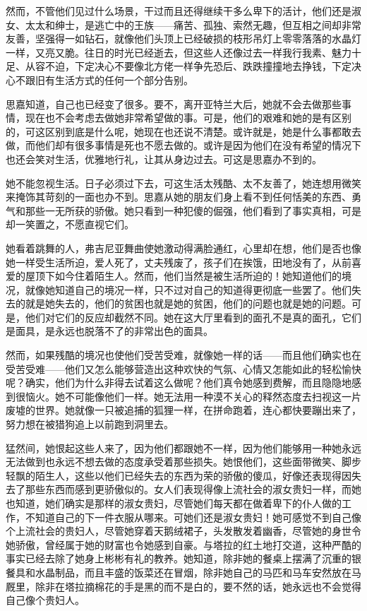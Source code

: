 \par 然而，不管他们见过什么场景，干过而且还得继续干多么卑下的活计，他们还是淑女、太太和绅士，是逃亡中的王族——痛苦、孤独、索然无趣，但互相之间却非常友善，坚强得一如钻石，就像他们头顶上已经破损的枝形吊灯上零零落落的水晶灯一样，又亮又脆。往日的时光已经逝去，但这些人还像过去一样我行我素、魅力十足、从容不迫，下定决心不要像北方佬一样争先恐后、跌跌撞撞地去挣钱，下定决心不跟旧有生活方式的任何一个部分告别。
\par 思嘉知道，自己也已经变了很多。要不，离开亚特兰大后，她就不会去做那些事情，现在也不会考虑去做她非常希望做的事。可是，他们的艰难和她的是有区别的，可这区别到底是什么呢，她现在也还说不清楚。或许就是，她是什么事都敢去做，而他们却有很多事情是死也不愿去做的。或许是因为他们在没有希望的情况下也还会笑对生活，优雅地行礼，让其从身边过去。可这是思嘉办不到的。
\par 她不能忽视生活。日子必须过下去，可这生活太残酷、太不友善了，她连想用微笑来掩饰其苛刻的一面也办不到。思嘉从她的朋友们身上看不到任何恬美的东西、勇气和那些一无所获的骄傲。她只看到一种犯傻的倔强，他们看到了事实真相，可是却一笑置之，不愿直视它们。
\par 她看着跳舞的人，弗吉尼亚舞曲使她激动得满脸通红，心里却在想，他们是否也像她一样受生活所迫，爱人死了，丈夫残废了，孩子们在挨饿，田地没有了，从前喜爱的屋顶下如今住着陌生人。然而，他们当然是被生活所迫的！她知道他们的境况，就像她知道自己的境况一样，只不过对自己的知道得更彻底一些罢了。他们失去的就是她失去的，他们的贫困也就是她的贫困，他们的问题也就是她的问题。可是，他们对它们的反应却截然不同。她在这大厅里看到的面孔不是真的面孔，它们是面具，是永远也脱落不了的非常出色的面具。
\par 然而，如果残酷的境况也使他们受苦受难，就像她一样的话——而且他们确实也在受苦受难——他们又怎么能够营造出这种欢快的气氛、心情又怎能如此的轻松愉快呢？确实，他们为什么非得去试着这么做呢？他们真令她感到费解，而且隐隐地感到很恼火。她不可能像他们一样。她无法用一种漠不关心的释然态度去扫视这一片废墟的世界。她就像一只被追捕的狐狸一样，在拼命跑着，连心都快要蹦出来了，努力想在被猎狗追上以前跑到洞里去。
\par 猛然间，她恨起这些人来了，因为他们都跟她不一样，因为他们能够用一种她永远无法做到也永远不想去做的态度承受着那些损失。她恨他们，这些面带微笑、脚步轻飘的陌生人，这些以他们已经失去的东西为荣的骄傲的傻瓜，好像还表现得因失去了那些东西而感到更骄傲似的。女人们表现得像上流社会的淑女贵妇一样，而她也知道，她们确实是那样的淑女贵妇，尽管她们每天都在做着卑下的仆人做的工作，不知道自己的下一件衣服从哪来。可她们还是淑女贵妇！她可感觉不到自己像个上流社会的贵妇人，尽管她穿着天鹅绒裙子，头发散发着幽香，尽管她的身世令她骄傲，曾经属于她的财富也令她感到自豪。与塔拉的红土地打交道，这种严酷的事实已经去除了她身上彬彬有礼的教养。她知道，除非她的餐桌上摆满了沉重的银餐具和水晶制品，而且丰盛的饭菜还在冒烟，除非她自己的马匹和马车安然放在马厩里，除非在塔拉摘棉花的手是黑的而不是白的，要不然的话，她永远也不会觉得自己像个贵妇人。
